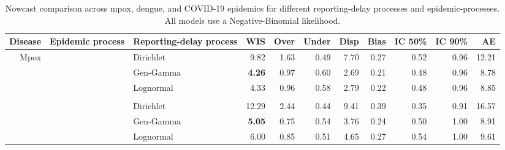 \documentclass[12pt]{article}
\begin{document}
\begin{table}[!htb]
\centering
\caption{Nowcast comparison across mpox, dengue, and COVID-19 epidemics for different reporting-delay processes and epidemic-processes. All models use a Negative-Binomial likelihood.}
\tiny
\setlength{\tabcolsep}{3pt}
\begin{tabular}{r | >{\raggedleft\arraybackslash}p{0.55in} | >{\raggedleft\arraybackslash}p{0.85in} | r r r r r r r r}
\toprule
\bf Disease & \bf Epidemic process & \bf Reporting-delay process & \bf WIS & \bf Over & \bf Under & \bf Disp & \bf Bias & \bf IC 50\% & \bf IC 90\% & \bf AE \\
\midrule

\multirow{15}{*}{Mpox} & \multirow{3}{*}{AR1}
& \cellcolor{delayC!25}Dirichlet & \cellcolor{delayC!25}9.82 & \cellcolor{delayC!25}1.63 & \cellcolor{delayC!25}0.49 & \cellcolor{delayC!25}7.70 & \cellcolor{delayC!25}0.27 & \cellcolor{delayC!25}0.52 & \cellcolor{delayC!25}0.96 & \cellcolor{delayC!25}12.21 \\
& & \cellcolor{delayB!25}Gen-Gamma & \cellcolor{delayB!25}\bf 4.26 & \cellcolor{delayB!25}0.97 & \cellcolor{delayB!25}0.60 & \cellcolor{delayB!25}2.69 & \cellcolor{delayB!25}0.21 & \cellcolor{delayB!25}0.48 & \cellcolor{delayB!25}0.96 & \cellcolor{delayB!25}8.78 \\
& & \cellcolor{delayA!25}Lognormal & \cellcolor{delayA!25}4.33 & \cellcolor{delayA!25}0.96 & \cellcolor{delayA!25}0.58 & \cellcolor{delayA!25}2.79 & \cellcolor{delayA!25}0.22 & \cellcolor{delayA!25}0.48 & \cellcolor{delayA!25}0.96 & \cellcolor{delayA!25}8.85 \\
\\
& \multirow{3}{*}{HSGP}
& \cellcolor{delayC!25}Dirichlet & \cellcolor{delayC!25}12.29 & \cellcolor{delayC!25}2.44 & \cellcolor{delayC!25}0.44 & \cellcolor{delayC!25}9.41 & \cellcolor{delayC!25}0.39 & \cellcolor{delayC!25}0.35 & \cellcolor{delayC!25}0.91 & \cellcolor{delayC!25}16.57 \\
& & \cellcolor{delayB!25}Gen-Gamma & \cellcolor{delayB!25}\bf 5.05 & \cellcolor{delayB!25}0.75 & \cellcolor{delayB!25}0.54 & \cellcolor{delayB!25}3.76 & \cellcolor{delayB!25}0.24 & \cellcolor{delayB!25}0.50 & \cellcolor{delayB!25}1.00 & \cellcolor{delayB!25}8.91 \\
& & \cellcolor{delayA!25}Lognormal & \cellcolor{delayA!25}6.00 & \cellcolor{delayA!25}0.85 & \cellcolor{delayA!25}0.51 & \cellcolor{delayA!25}4.65 & \cellcolor{delayA!25}0.27 & \cellcolor{delayA!25}0.54 & \cellcolor{delayA!25}1.00 & \cellcolor{delayA!25}9.61 \\

\end{tabular}
\end{table}
\end{document}

